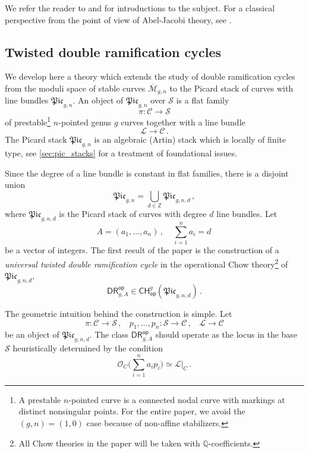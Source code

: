 \documentclass[a4paper,12pt]{article} %
\def\cO{\mathcal{O}}
\def\cM{{\mathcal{M}}}
\theoremstyle{definition}
\theoremstyle{plain}%
\newcommand{\Picabs}{\mathfrak{Pic}}
\begin{document}
We refer the
reader to \cite[Section 0]{Janda2016Double-ramifica} and \cite[Section 5]{RPSLC} for introductions to the subject. For a classical perspective from the point of view
of Abel-Jacobi theory, see 
\cite{Holmes2017Extending-the-d}.



\subsection{Twisted double ramification cycles}
We develop here a theory which extends the study of double ramification
cycles from the moduli space of stable  curves $\overline{\cM}_{g,n}$ to the Picard stack of
curves with line bundles $\Picabs_{g,n}$.
An object of $\Picabs_{g,n}$ over $\mathcal{S}$ is
a flat family $$\pi:\mathcal{C} \rightarrow \mathcal{S}$$ of prestable{\footnote{A prestable $n$-pointed
curve is a connected nodal curve with markings at distinct nonsingular points.
For the entire paper, we avoid the $(g,n)=(1,0)$ case because of 
non-affine stabilizers.}}
    $n$-pointed genus $g$ curves together with a line bundle
    $$\mathcal{L} \rightarrow \mathcal{C}\,. $$
The Picard stack $\Picabs_{g,n}$ is an algebraic (Artin) stack
which is locally of finite type, see \cref{sec:pic_stacks} for a treatment
of foundational issues. 


Since the degree of a line bundle is constant in flat families, there is a
disjoint union
$$\Picabs_{g,n} =\bigcup_{d\in \mathbb{Z}}  \Picabs_{g,n,d}\, ,$$
where $\Picabs_{g,n,d}$ is the Picard stack of curves with degree $d$
line bundles.
Let $$A = (a_1, \dots, a_n)\,,\ \ \ \ \  \sum_{i=1}^n a_i=d \,$$
be a vector of integers.
The first result of the paper is the construction of a 
{\em universal twisted double ramification
cycle} in the operational Chow theory{\footnote{All
Chow theories in the paper will be taken with $\mathbb{Q}$-coefficients.
}} of $\Picabs_{g,n,d}$,
$$\mathsf{DR}^{\mathsf{op}}_{g,A} \in {\mathsf{CH}}^g_{\mathsf{op}}(\Picabs_{g,n,d})\, .$$

The geometric intuition behind the construction is simple.
Let 
$$\pi:\mathcal{C}\rightarrow \mathcal{S}\, ,
\ \ \ \ p_1,\ldots,p_n: \mathcal{S} \rightarrow \mathcal{C}\, ,
\ \ \ \ \mathcal{L}\rightarrow \mathcal{C}$$
be an object of $\Picabs_{g,n,d}$.
The class
$\mathsf{DR}^{\mathsf{op}}_{g,A}$ should operate as the 
locus in the base $\mathcal{S}$ heuristically determined by the condition
$$
\cO_C\Big(\sum_{i=1}^n a_i p_i\Big) \simeq \mathcal{L}|_{C} \,.$$
\end{document}
